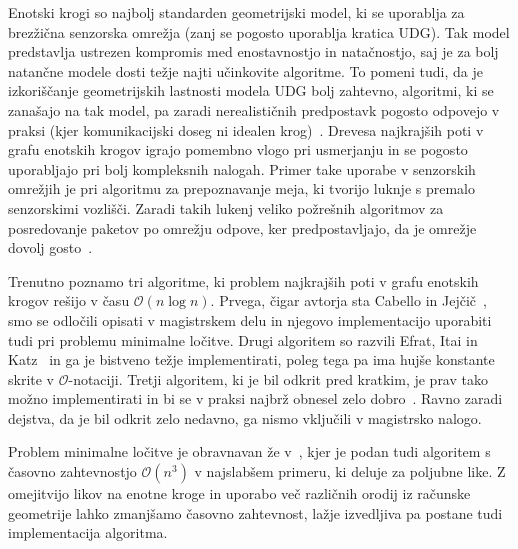 \documentclass[a4paper, 12pt]{book}
\newcommand{\OO}{\ensuremath{\mathcal{O}}} %
\begin{document}
Enotski krogi so najbolj standarden geometrijski model, ki se uporablja za brezžična senzorska omrežja (zanj se pogosto uporablja kratica UDG). Tak model predstavlja ustrezen kompromis med enostavnostjo in natačnostjo, saj je za bolj natančne modele dosti težje najti učinkovite algoritme. To pomeni tudi, da je izkoriščanje geometrijskih lastnosti modela UDG bolj zahtevno, algoritmi, ki se zanašajo na tak model, pa zaradi nerealističnih predpostavk pogosto odpovejo v praksi (kjer komunikacijski doseg ni idealen krog)~\cite{WGM06}. Drevesa najkrajših poti v grafu enotskih krogov igrajo pomembno vlogo pri usmerjanju in se pogosto uporabljajo pri bolj kompleksnih nalogah. Primer take uporabe v senzorskih omrežjih je pri algoritmu za prepoznavanje meja, ki tvorijo luknje s premalo senzorskimi vozlišči. Zaradi takih lukenj veliko požrešnih algoritmov za posredovanje paketov po omrežju odpove, ker predpostavljajo, da je omrežje dovolj gosto~\cite{FGG06}.

Trenutno poznamo tri algoritme, ki problem najkrajših poti v grafu enotskih krogov rešijo v času $\OO(n\log n)$. Prvega, čigar avtorja sta Cabello in Jejčič~\cite{CJ15}, smo se odločili opisati v magistrskem delu in njegovo implementacijo uporabiti tudi pri problemu minimalne ločitve.
Drugi algoritem so razvili Efrat, Itai in Katz~\cite{eik-01} in ga je bistveno težje implementirati, poleg tega pa ima hujše konstante skrite v \OO -notaciji.
Tretji algoritem, ki je bil odkrit pred kratkim, je prav tako možno implementirati in bi se v praksi najbrž obnesel zelo dobro~\cite{ChanS16}. Ravno zaradi dejstva, da je bil odkrit zelo nedavno, ga nismo vključili v magistrsko nalogo.

Problem minimalne ločitve je obravnavan že v~\cite{CG16}, kjer je podan tudi algoritem s časovno zahtevnostjo $\OO(n^3)$ v najslabšem primeru, ki deluje za poljubne like. Z omejitvijo likov na enotne kroge in uporabo več različnih orodij iz računske geometrije lahko zmanjšamo časovno zahtevnost, lažje izvedljiva pa postane tudi implementacija algoritma.
\end{document}
